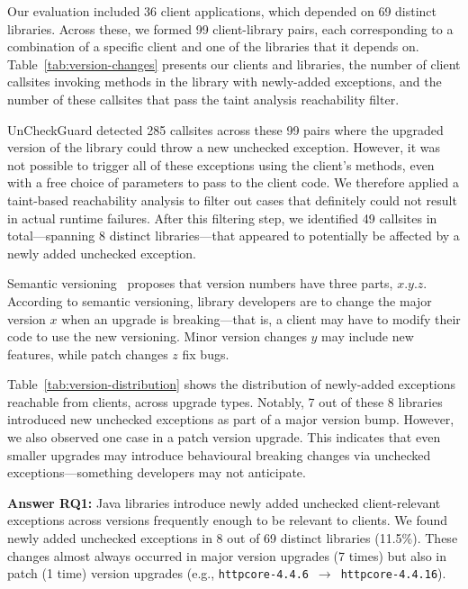 Our evaluation included 36 client applications, which depended on 69 distinct libraries. Across these, we formed 99 client-library pairs, each corresponding to a combination of a specific client and one of the libraries that it depends on. Table~\ref{tab:version-changes} presents our clients and libraries, the number of client callsites invoking methods in the library with newly-added exceptions, and the number of these callsites that pass the taint analysis reachability filter.

UnCheckGuard detected 285 callsites across these 99 pairs where the upgraded version of the library could throw a new unchecked exception. However, it was not possible to trigger all of these exceptions using the client's methods, even with a free choice of parameters to pass to the client code. We therefore applied a taint-based reachability analysis to filter out cases that definitely could not result in actual runtime failures. After this filtering step, we identified 49 callsites in total—spanning 8 distinct libraries—that appeared to potentially be affected by a newly added unchecked exception.

Semantic versioning~\cite{preston-werner23:_seman_version} proposes that version numbers have three parts, $x.y.z$. According to semantic versioning, library developers are to change the major version $x$ when an upgrade is breaking---that is, a client may have to modify their code to use the new versioning. Minor version changes $y$ may include new features, while patch changes $z$ fix bugs.

Table~\ref{tab:version-distribution} shows the distribution of newly-added exceptions reachable from clients, across upgrade types. Notably, 7 out of these 8 libraries introduced new unchecked exceptions as part of a major version bump. However, we also observed one case in a patch version upgrade. This indicates that even smaller upgrades may introduce behavioural breaking changes via unchecked exceptions—something developers may not anticipate.


\vspace{1em}
\begin{tcolorbox}[colback=gray!10, colframe=black]
\textbf{Answer RQ1:} Java libraries introduce newly added unchecked client-relevant exceptions across versions frequently enough to be relevant to clients. We found newly added unchecked exceptions in 8 out of 69 distinct libraries (11.5\%). These changes almost always occurred in major version upgrades (7 times) but also in patch (1 time) version upgrades (e.g., \texttt{httpcore-4.4.6}~$\rightarrow$~\texttt{httpcore-4.4.16}).
\end{tcolorbox}
\vspace{1em}

